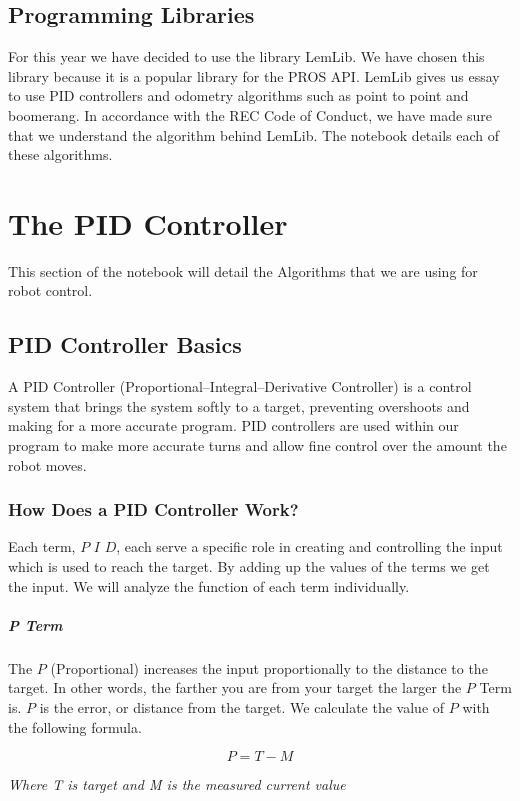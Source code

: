 \documentclass[12pt]{report}
\begin{document}
\section{Programming Libraries}
For this year we have decided to use the library LemLib.
We have chosen this library because it is a popular library for the PROS API. 
LemLib gives us essay to use PID controllers and odometry algorithms such as point to point and boomerang.
In accordance with the REC Code of Conduct, 
    we have made sure that we understand the algorithm behind LemLib. 
The notebook details each of these algorithms.

\chapter{The PID Controller}
This section of the notebook will detail the Algorithms that we are using for robot control.
\section{PID Controller Basics}
    A PID Controller (Proportional–Integral–Derivative Controller) is a control system that brings the system softly to a target,
        preventing overshoots and making for a more accurate program. 
    PID controllers are used within our program to make more accurate turns and allow fine control over the amount the robot moves.

\subsection{How Does a PID Controller Work?} \label{howPID}
    Each term, $P$ $I$ $D$, each serve a specific role in creating and controlling the input which is used to reach the target. 
    By adding up the values of the terms we get the input. We will analyze the function of each term individually.

\paragraph{P Term}
    The $P$ (Proportional) increases the input proportionally to the distance to the target.
    In other words, the farther you are from your target the larger the $P$ Term is. 
    $P$ is the error, or distance from the target. We calculate the value of $P$ with the following formula.

    $$ P = T - M$$
    \begin{center}\em{Where T is target and M is the measured current value}\end{center}
\end{document}
